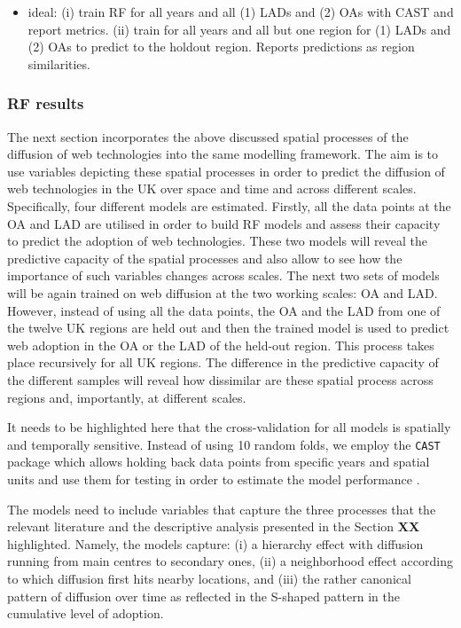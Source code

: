 \documentclass[
  authoryear,
  preprint,
  3p]{elsarticle}
\providecommand{\tightlist}{%
  \setlength{\itemsep}{0pt}\setlength{\parskip}{0pt}}\usepackage{longtable,booktabs,array}
\begin{document}
\begin{itemize}
\tightlist
\item
  ideal: (i) train RF for all years and all (1) LADs and (2) OAs with
  CAST and report metrics. (ii) train for all years and all but one
  region for (1) LADs and (2) OAs to predict to the holdout region.
  Reports predictions as region similarities.
\end{itemize}

\subsubsection{RF results}\label{rf-results}

The next section incorporates the above discussed spatial processes of
the diffusion of web technologies into the same modelling framework. The
aim is to use variables depicting these spatial processes in order to
predict the diffusion of web technologies in the UK over space and time
and across different scales. Specifically, four different models are
estimated. Firstly, all the data points at the OA and LAD are utilised
in order to build RF models and assess their capacity to predict the
adoption of web technologies. These two models will reveal the
predictive capacity of the spatial processes and also allow to see how
the importance of such variables changes across scales. The next two
sets of models will be again trained on web diffusion at the two working
scales: OA and LAD. However, instead of using all the data points, the
OA and the LAD from one of the twelve UK regions are held out and then
the trained model is used to predict web adoption in the OA or the LAD
of the held-out region. This process takes place recursively for all UK
regions. The difference in the predictive capacity of the different
samples will reveal how dissimilar are these spatial process across
regions and, importantly, at different scales.

It needs to be highlighted here that the cross-validation for all models
is spatially and temporally sensitive. Instead of using 10 random folds,
we employ the \texttt{CAST} package which allows holding back data
points from specific years and spatial units and use them for testing in
order to estimate the model performance \citep{meyer2018improving}.

The models need to include variables that capture the three processes
that the relevant literature and the descriptive analysis presented in
the Section \textbf{XX} highlighted. Namely, the models capture: (i) a
hierarchy effect with diffusion running from main centres to secondary
ones, (ii) a neighborhood effect according to which diffusion first hits
nearby locations, and (iii) the rather canonical pattern of diffusion
over time as reflected in the S-shaped pattern in the cumulative level
of adoption.
\end{document}

